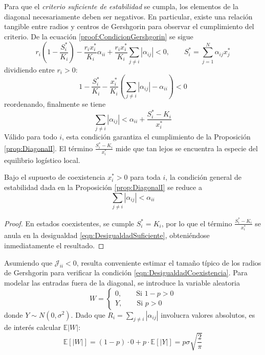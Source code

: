 Para que el \textit{criterio suficiente de estabilidad} se cumpla, los elementos de la diagonal necesariamente deben ser negativos. En particular, existe una relación tangible entre radios y centros de Gershgorin para observar el cumplimiento del criterio. De la ecuación \eqref{proof:CondicionGershgorin} se sigue
$$r_i\left (1-\frac{S_i^*}{K_i}\right )-\frac{r_ix_i^*}{K_i}\alpha_{ii}+\frac{r_ix_i^*}{K_i}\sum_{j\neq i}|\alpha_{ij}|<0,\qquad S_i^*=\sum_{j=1}^N\alpha_{ij}x_j^*$$
dividiendo entre $r_i>0$:
$$1-\frac{S_i^*}{K_i}-\frac{x_i^*}{K_i}\left (\sum_{j\neq i}|\alpha_{ij}|-\alpha_{ii}\right )<0$$
reordenando, finalmente se tiene
\begin{equation}\label{eqn:DesigualdadSuficiente}
	\sum_{j\neq i}|\alpha_{ij}|<\alpha_{ii}+\frac{S_i^*-K_i}{x_i^*}
\end{equation}
Válido para todo $i$, esta condición garantiza el cumplimiento de la Proposición \ref{prop:DiagonalI}. El término $\frac{S_i^*-K_i}{x_i^*}$ mide que tan lejos se encuentra la especie del equilibrio logístico local. 
\begin{corolario}
	Bajo el supuesto de coexistencia $x_i^*>0$ para toda $i$, la condición general de estabilidad dada en la Proposición \ref{prop:DiagonalI} se reduce a 
	\begin{equation}\label{eqn:DesigualdadCoexistencia}
		\sum_{j\neq i}|\alpha_{ij}|<\alpha_{ii}
	\end{equation}
\end{corolario}
\begin{proof}
	En estados coexistentes, se cumple $S_i^*=K_i$, por lo que el término $\frac{S_i^*-K_i}{x_i^*}$ se anula en la desigualdad \eqref{eqn:DesigualdadSuficiente}, obteniéndose inmediatamente el resultado.
\end{proof}
Asumiendo que $\mathcal{J}_{ii}<0$, resulta conveniente estimar el tamaño típico de los radios de Gershgorin para verificar la condición \eqref{eqn:DesigualdadCoexistencia}. Para modelar las entradas fuera de la diagonal, se introduce la variable aleatoria
$$	W = 
\begin{cases}
	0,\qquad \text{Si }1-p>0\\
	Y,\qquad \text{Si }p>0	
\end{cases}$$
donde $Y\sim N(0,\sigma^2)$. Dado que $R_i=\sum_{j\neq i}|\alpha_{ij}|$ involucra valores absolutos, es de interés calcular $\mathbb{E}|W|$: 
$$\mathbb{E}[|W|]=(1-p)\cdot 0 + p\cdot \mathbb{E}[|Y|] = p\sigma\sqrt{\frac{2}{\pi}}$$
